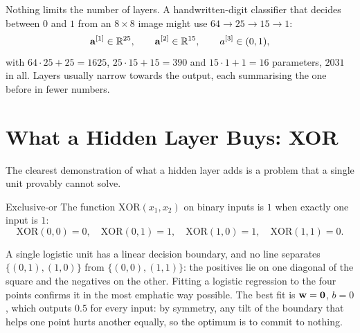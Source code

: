 Nothing limits the number of layers. A handwritten-digit classifier that decides
between $0$ and $1$ from an $8\times8$ image might use $64\to25\to15\to1$:
\[
  \mathbf{a}^{[1]} \in \mathbb{R}^{25},\qquad \mathbf{a}^{[2]} \in \mathbb{R}^{15},\qquad a^{[3]} \in (0,1),
\]
with $64\cdot25+25 = 1625$, $25\cdot15+15 = 390$ and $15\cdot1+1 = 16$
parameters, $2031$ in all. Layers usually narrow towards the output, each
summarising the one before in fewer numbers.

\section{What a Hidden Layer Buys: XOR}
\label{sec:xor}

The clearest demonstration of what a hidden layer adds is a problem that a
single unit provably cannot solve.

\begin{defbox}{Exclusive-or}
The function $\mathrm{XOR}(x_1, x_2)$ on binary inputs is $1$ when exactly one
input is $1$:
\[
  \mathrm{XOR}(0,0) = 0,\quad \mathrm{XOR}(0,1) = 1,\quad
  \mathrm{XOR}(1,0) = 1,\quad \mathrm{XOR}(1,1) = 0 .
\]
\end{defbox}

A single logistic unit has a linear decision boundary, and no line separates
$\{(0,1),(1,0)\}$ from $\{(0,0),(1,1)\}$: the positives lie on one diagonal of
the square and the negatives on the other. Fitting a logistic regression to the
four points confirms it in the most emphatic way possible. The best fit is
$\mathbf{w} = \mathbf{0}$, $b = 0$, which outputs $0.5$ for every input: by symmetry,
any tilt of the boundary that helps one point hurts another equally, so the
optimum is to commit to nothing.

